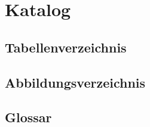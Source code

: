 
\chapter{Katalog}


\section{Tabellenverzeichnis}


\section{Abbildungsverzeichnis}


\section{Glossar}